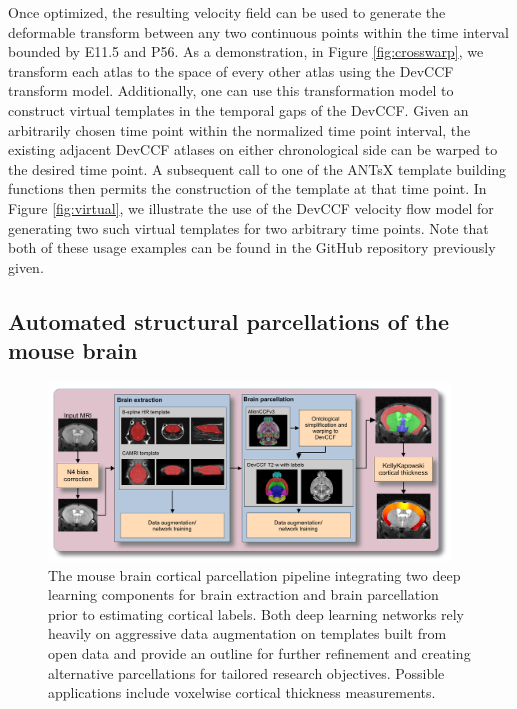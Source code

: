 \documentclass[
  12pt,
]{article}
\begin{document}
Once optimized, the resulting velocity field can be used to generate the
deformable transform between any two continuous points within the time
interval bounded by E11.5 and P56. As a demonstration, in Figure
\ref{fig:crosswarp}, we transform each atlas to the space of every other
atlas using the DevCCF transform model. Additionally, one can use this
transformation model to construct virtual templates in the temporal gaps
of the DevCCF. Given an arbitrarily chosen time point within the
normalized time point interval, the existing adjacent DevCCF atlases on
either chronological side can be warped to the desired time point. A
subsequent call to one of the ANTsX template building functions then
permits the construction of the template at that time point. In Figure
\ref{fig:virtual}, we illustrate the use of the DevCCF velocity flow
model for generating two such virtual templates for two arbitrary time
points. Note that both of these usage examples can be found in the
GitHub repository previously given.

\subsection{Automated structural parcellations of the mouse
brain}\label{automated-structural-parcellations-of-the-mouse-brain}

\begin{figure}
\centering
\includegraphics[width=0.95\textwidth]{Figures/mousePipeline.pdf}
\caption{The mouse brain cortical parcellation pipeline integrating two deep
learning components for brain extraction and brain parcellation prior to
estimating cortical labels. Both deep learning networks rely heavily on
aggressive data augmentation on templates built from open data and provide an
outline for further refinement and creating alternative parcellations for
tailored research objectives.  Possible applications include
voxelwise cortical thickness measurements.}
\label{fig:mouseKK}
\end{figure}
\end{document}
